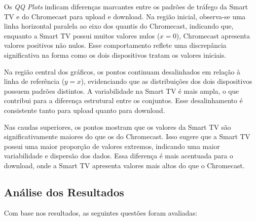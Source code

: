 Os \textit{QQ Plots} indicam diferenças marcantes entre os padrões de tráfego da Smart TV e do Chromecast para upload e download. Na região inicial, observa-se uma linha horizontal paralela ao eixo dos quantis do Chromecast, indicando que, enquanto a Smart TV possui muitos valores nulos (\(x = 0\)), Chromecast apresenta valores positivos não nulos. Esse comportamento reflete uma discrepância significativa na forma como os dois dispositivos tratam os valores iniciais.

Na região central dos gráficos, os pontos continuam desalinhados em relação à linha de referência (\(y = x\)), evidenciando que as distribuições dos dois dispositivos possuem padrões distintos. A variabilidade na Smart TV é mais ampla, o que contribui para a diferença estrutural entre os conjuntos. Esse desalinhamento é consistente tanto para upload quanto para download.

Nas caudas superiores, os pontos mostram que os valores da Smart TV são significativamente maiores do que os do Chromecast. Isso sugere que a Smart TV possui uma maior proporção de valores extremos, indicando uma maior variabilidade e dispersão dos dados. Essa diferença é mais acentuada para o download, onde a Smart TV apresenta valores mais altos do que o Chromecast.

\subsection{Análise dos Resultados}

Com base nos resultados, as seguintes questões foram avaliadas:

